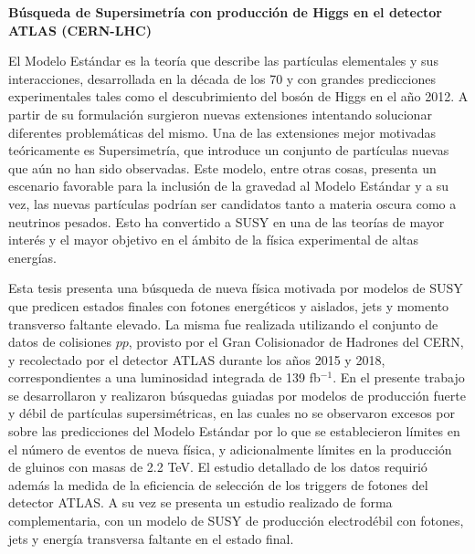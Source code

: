 {\centering \bf \Large  Búsqueda de Supersimetría con producción de Higgs en el detector ATLAS (CERN-LHC)\\}

\vspace{2cm}

El Modelo Estándar es la teoría que describe las partículas elementales y sus interacciones, desarrollada en la década de los 70 y con grandes predicciones experimentales tales como el descubrimiento del bosón de Higgs en el año 2012. A partir de su formulación surgieron nuevas extensiones intentando solucionar diferentes problemáticas del mismo. Una de las extensiones mejor motivadas teóricamente es Supersimetría, que introduce un conjunto de partículas nuevas que aún no han sido observadas. Este modelo, entre otras cosas, presenta un escenario favorable para la inclusión de la gravedad al Modelo Estándar y a su vez, las nuevas partículas podrían ser candidatos tanto a materia oscura como a neutrinos pesados. Esto ha convertido a SUSY en una de las teorías de mayor interés y el mayor objetivo en el ámbito de la física experimental de altas energías.

Esta tesis presenta una búsqueda de nueva física motivada por modelos de SUSY que predicen estados finales con fotones energéticos y aislados, jets y momento transverso faltante elevado. La misma fue realizada utilizando el conjunto de datos de colisiones $pp$, provisto por el Gran Colisionador de Hadrones del CERN, y recolectado por el detector ATLAS durante los años 2015 y 2018, correspondientes a una luminosidad integrada de 139 fb$^{-1}$. En el presente trabajo se desarrollaron y realizaron búsquedas guiadas por modelos de producción fuerte y débil de partículas supersimétricas, en las cuales no se observaron excesos por sobre las predicciones del Modelo Estándar por lo que se establecieron límites en el número de eventos de nueva física, y adicionalmente límites en la producción de gluinos con masas de 2.2 TeV.
El estudio detallado de los datos requirió además la medida de la eficiencia de selección de los triggers de fotones del detector ATLAS. A su vez se presenta un estudio realizado de forma complementaria, con un modelo de SUSY de producción electrodébil con fotones, jets y energía transversa faltante en el estado final.

